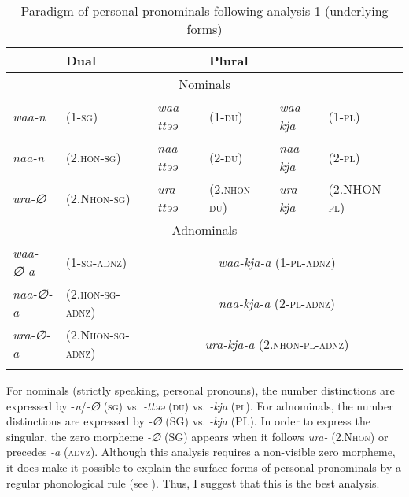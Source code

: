 \begin{table}
\caption{\label{tab:key:36}Paradigm of personal pronominals following analysis 1 (underlying forms)}
\begin{tabular}{l@{ }ll@{ }ll@{ }l}
\lsptoprule
\multicolumn{2}{l}{Singular} & \multicolumn{2}{l}{Dual} & \multicolumn{2}{l}{Plural}\\\midrule
\multicolumn{6}{c}{Nominals}\\\midrule
           \textit{waa-n} & (1-\textsc{sg})               & \textit{waa-ttəə} & (1-\textsc{du})      & \textit{waa-kja}  & (1-\textsc{pl})\\
           \textit{naa-n} &  (2.\textsc{hon}-\textsc{sg})          & \textit{naa-ttəə} & (2-\textsc{du})      & \textit{naa-kja}  & (2-\textsc{pl})\\
           \textit{ura-∅} &  (2.N\textsc{hon}-\textsc{sg})         & \textit{ura-ttəə} & (2.\textsc{nhon}-\textsc{du}) & \textit{ura-kja}  & (2.NHON-\textsc{pl})\\\midrule
\multicolumn{6}{c}{Adnominals}\\\midrule
           \textit{waa-∅-a} &  (1-\textsc{sg}-\textsc{adnz})       & \multicolumn{4}{c}{\textit{waa-kja-a} (1-\textsc{pl}-\textsc{adnz})}\\
           \textit{naa-∅-a} & (2.\textsc{hon}-\textsc{sg}-\textsc{adnz})    & \multicolumn{4}{c}{\textit{naa-kja-a} (2-\textsc{pl}-\textsc{adnz})}\\
           \textit{ura-∅-a} &  (2.N\textsc{hon}-\textsc{sg}-\textsc{adnz})  & \multicolumn{4}{c}{\textit{ura-kja-a} (2.\textsc{nhon}-\textsc{pl}-\textsc{adnz})}\\
\lspbottomrule
\end{tabular}
\end{table}

For nominals (strictly speaking, personal pronouns), the number distinctions are expressed by -\textit{n}/\textit{{}-∅} (\textsc{sg}) vs. \textit{{}-ttəə} (\textsc{du}) vs. \textit{{}-kja} (\textsc{pl}). For adnominals, the number distinctions are expressed by \textit{{}-∅} (SG) vs. \textit{{}-kja} (PL). In order to express the singular, the zero morpheme \textit{{}-∅} (SG) appears when it follows \textit{ura-} (2.N\textsc{hon}) or precedes \textit{{}-a} (\textsc{advz}). Although this analysis requires a non-visible zero morpheme, it does make it possible to explain the surface forms of personal pronominals by a regular phonological rule (see ). Thus, I suggest that this is the best analysis.

